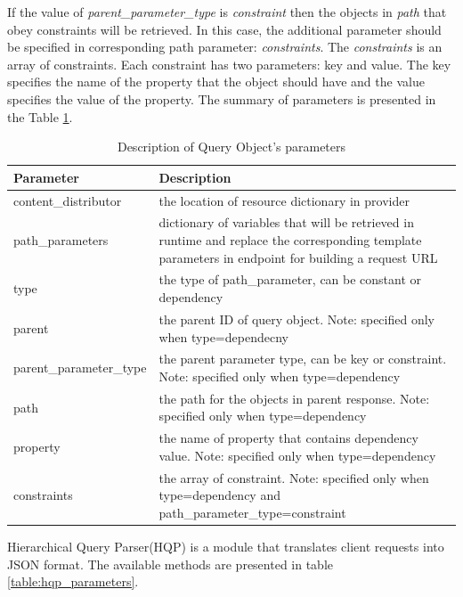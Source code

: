 If the value of \textit{parent\_parameter\_type} is \textit{constraint} then the objects in \textit{path} that obey constraints will be retrieved. In this case, the additional parameter should be specified in corresponding path parameter: \textit{constraints}. The \textit{constraints} is an array of constraints. Each constraint has two parameters: key and value. The key specifies the name of the property that the object should have and the value specifies the value of the property. The summary of parameters is presented in the Table \ref{table:query_obj_desrc}.


\begin{center}
	\begin{table}
	  	\caption{Description of Query Object's parameters}
	 	\label{table:query_obj_desrc}
	  	\begin{tabular}{|l|p{4in}|}
	    \hline
	    Parameter & Description  \\ \hline
	    content\_distributor & the location of resource dictionary in provider  \\ \hline
	    path\_parameters & dictionary of variables that will be retrieved in runtime and replace the corresponding template parameters in endpoint for building a request URL  \\ \hline
	    type & the type of path\_parameter, can be constant or dependency  \\ \hline
	    parent & the parent ID of query object. Note: specified only when type=dependecny \\ \hline
	    parent\_parameter\_type & the parent parameter type, can be key or constraint. Note: specified only when type=dependency \\ \hline
	    path & the path for the objects in parent response. Note: specified only when type=dependency \\ \hline
	    property & the name of property that contains dependency value. Note: specified only when type=dependency \\ \hline
	    constraints & the array of constraint. Note: specified only when type=dependency  and path\_parameter\_type=constraint\\ \hline
	    \hline
		\end{tabular}
  	\end{table}
\end{center}


Hierarchical Query Parser(HQP) is a module that translates client requests into JSON format. The available methods are presented in table \ref{table:hqp_parameters}.

